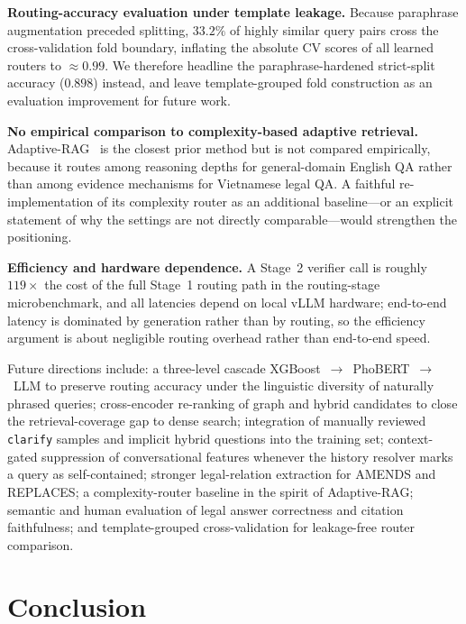 \documentclass[pdflatex,sn-mathphys-num]{sn-jnl}
\begin{document}
\noindent\textbf{Routing-accuracy evaluation under template leakage.} Because
paraphrase augmentation preceded splitting, $33.2\%$ of highly similar query
pairs cross the cross-validation fold boundary, inflating the absolute CV
scores of all learned routers to $\approx 0.99$. We therefore headline the
paraphrase-hardened strict-split accuracy ($0.898$) instead, and leave
template-grouped fold construction as an evaluation improvement for future
work.

\noindent\textbf{No empirical comparison to complexity-based adaptive
retrieval.} Adaptive-RAG~\cite{jeong2024adaptive} is the closest prior method
but is not compared empirically, because it routes among reasoning depths for
general-domain English QA rather than among evidence mechanisms for Vietnamese
legal QA. A faithful re-implementation of its complexity router as an
additional baseline---or an explicit statement of why the settings are not
directly comparable---would strengthen the positioning.

\noindent\textbf{Efficiency and hardware dependence.} A Stage~2 verifier call
is roughly $119\times$ the cost of the full Stage~1 routing path in the
routing-stage microbenchmark, and all latencies depend on local vLLM
hardware; end-to-end latency is dominated by generation rather than by
routing, so the efficiency argument is about negligible routing overhead
rather than end-to-end speed.

Future directions include: a three-level cascade
XGBoost~$\rightarrow$~PhoBERT~$\rightarrow$~LLM to preserve routing accuracy
under the linguistic diversity of naturally phrased queries; cross-encoder
re-ranking of graph and hybrid candidates to close the retrieval-coverage
gap to dense search;
integration of manually reviewed \texttt{clarify} samples and implicit hybrid
questions into the training set; context-gated suppression of conversational
features whenever the history resolver marks a query as self-contained;
stronger legal-relation extraction for
\textsc{AMENDS} and \textsc{REPLACES}; a complexity-router baseline in the
spirit of Adaptive-RAG; semantic and human evaluation of legal answer
correctness and citation faithfulness; and template-grouped cross-validation
for leakage-free router comparison.

\section{Conclusion}\label{sec:conclusion}
\end{document}
